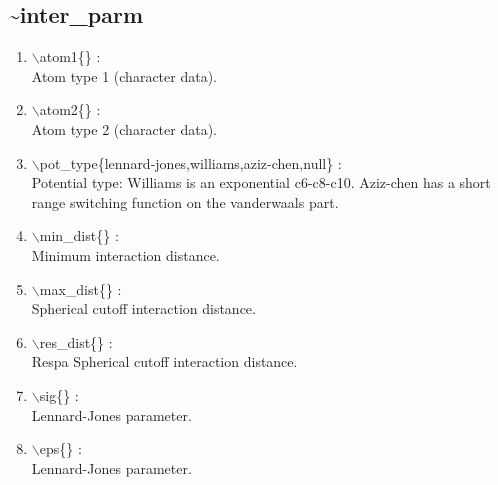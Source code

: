 \documentclass[12pt,titlepage]{article}
\begin{document}

\newpage
\subsection*{\bf \~{}inter\_parm}

\begin{enumerate}

 \vspace{0.15in} 
 \item  $\backslash$atom1\{\} : \\ 
    Atom type 1 (character data).

 \vspace{0.15in} 
 \item  $\backslash$atom2\{\} : \\ 
    Atom type 2 (character data).

 \vspace{0.15in} 
 \item  $\backslash$pot\_type\{lennard-jones,williams,aziz-chen,null\} : \\ 
    Potential type: Williams is an exponential c6-c8-c10. Aziz-chen has
    a short range switching function on the vanderwaals part.

 \vspace{0.15in} 
 \item  $\backslash$min\_dist\{\} : \\ 
    Minimum interaction distance.

 \vspace{0.15in} 
 \item  $\backslash$max\_dist\{\} : \\ 
    Spherical cutoff interaction distance.

 \vspace{0.15in} 
 \item  $\backslash$res\_dist\{\} : \\ 
    Respa Spherical cutoff interaction distance.

 \vspace{0.15in} 
 \item  $\backslash$sig\{\} : \\ 
    Lennard-Jones parameter.

 \vspace{0.15in} 
 \item  $\backslash$eps\{\} : \\ 
    Lennard-Jones parameter.


\end{enumerate}
\end{document}
